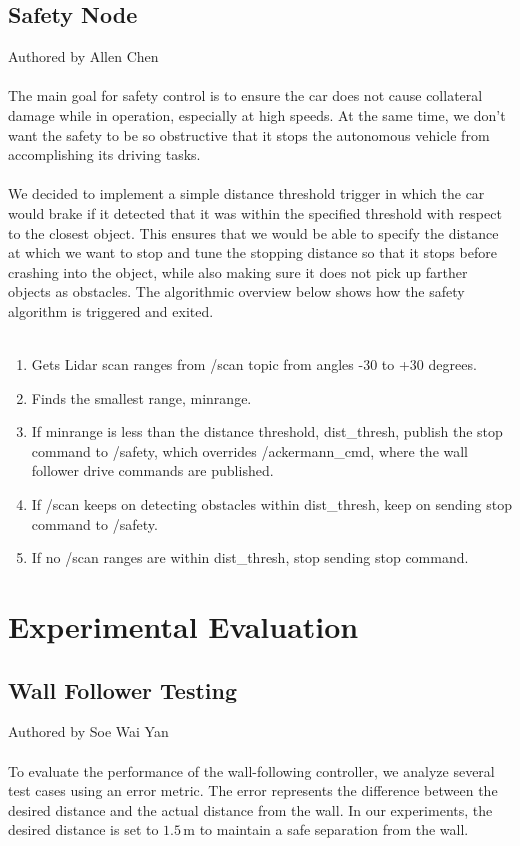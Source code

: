 \documentclass{article}
\begin{document}
\subsection{Safety Node} 
Authored by Allen Chen \\\\
The main goal for safety control is to ensure the car does not cause collateral damage while in operation, especially at high speeds. At the same time, we don’t want the safety to be so obstructive that it stops the autonomous vehicle from accomplishing its driving tasks.\\\\
We decided to implement a simple distance threshold trigger in which the car would brake if it detected that it was within the specified threshold with respect to the closest object. This ensures that we would be able to specify the distance at which we want to stop and tune the stopping distance so that it stops before crashing into the object, while also making sure it does not pick up farther objects as obstacles. The algorithmic overview below shows how the safety algorithm is triggered and exited.\\\\
\begin{enumerate}
    \item Gets Lidar scan ranges from /scan topic from angles -30 to +30 degrees.
    \item Finds the smallest range, minrange.
    \item If minrange is less than the distance threshold, dist\_thresh, publish the stop command to /safety, which overrides /ackermann\_cmd, where the wall follower drive commands are published.
    \item If /scan keeps on detecting obstacles within dist\_thresh, keep on sending stop command to /safety.
    \item If no /scan ranges are within dist\_thresh, stop sending stop command.
\end{enumerate}

\section{Experimental Evaluation}

\subsection{Wall Follower Testing}
Authored by Soe Wai Yan\\\\
To evaluate the performance of the wall-following controller, we analyze several test cases using an error metric. The error represents the difference between the desired distance and the actual distance from the wall. In our experiments, the desired distance is set to $1.5\,\text{m}$ to maintain a safe separation from the wall.
\end{document}
